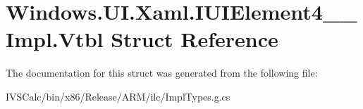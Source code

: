 \hypertarget{struct_windows_1_1_u_i_1_1_xaml_1_1_i_u_i_element4_____impl_1_1_vtbl}{}\section{Windows.\+U\+I.\+Xaml.\+I\+U\+I\+Element4\+\_\+\+\_\+\+Impl.\+Vtbl Struct Reference}
\label{struct_windows_1_1_u_i_1_1_xaml_1_1_i_u_i_element4_____impl_1_1_vtbl}


The documentation for this struct was generated from the following file\+:\begin{DoxyCompactItemize}
\item 
I\+V\+S\+Calc/bin/x86/\+Release/\+A\+R\+M/ilc/Impl\+Types.\+g.\+cs\end{DoxyCompactItemize}
